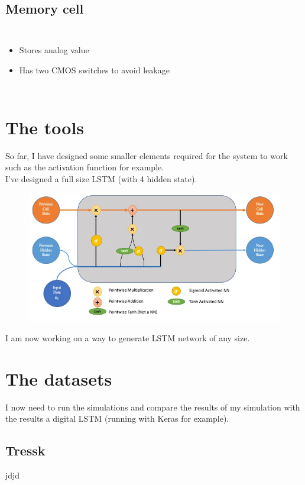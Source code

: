 \documentclass[14pt]{beamer}
\begin{document}
\subsection{Memory cell}

\begin{frame}{\insertsection}{\insertsubsection}
  \begin{columns}
    
    \begin{itemize}
      \item Stores analog value
      \item Has two CMOS switches to avoid leakage
    \end{itemize}
  \end{columns}
\end{frame}

\begin{frame}{\insertsection}{\insertsubsection}
  \begin{center}
    
  \end{center}
\end{frame}

\section{The tools}
\begin{frame}{\insertsection}{\insertsubsection}
  So far, I have designed some smaller elements required for the system to work such as the activation function for example.\\
  I've designed a full size LSTM (with 4 hidden state).
  \begin{figure}
    \centering
    \includegraphics[height=0.35\textheight]{lstm/lstm.png}
  \end{figure}
  I am now working on a way to generate LSTM network of any size.
\end{frame}

\section{The datasets}
\begin{frame}{\insertsection}{\insertsubsection}
  I now need to run the simulations and compare the results of my simulation with the results a digital LSTM (running with Keras for example).
\end{frame}

\subsection{Tressk}
\begin{frame}{jdjd}{}
\end{frame}
\end{document}
